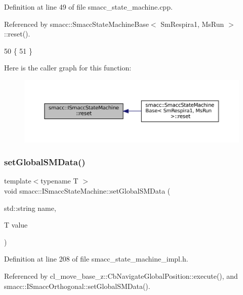 Definition at line 49 of file smacc\+\_\+state\+\_\+machine.\+cpp.



Referenced by smacc\+::\+Smacc\+State\+Machine\+Base$<$ Sm\+Respira1, Ms\+Run $>$\+::reset().


\begin{DoxyCode}
50 \{
51 \}
\end{DoxyCode}
Here is the caller graph for this function\+:
\nopagebreak
\begin{figure}[H]
\begin{center}
\leavevmode
\includegraphics[width=350pt]{classsmacc_1_1ISmaccStateMachine_a9e4b4fe4dda962642397993235c6eea0_icgraph}
\end{center}
\end{figure}
\mbox{\label{classsmacc_1_1ISmaccStateMachine_a8588f9e580fbb95b53e2bd2ca3ff1f98}} 
\subsubsection{\texorpdfstring{set\+Global\+S\+M\+Data()}{setGlobalSMData()}}
{\footnotesize\ttfamily template$<$typename T $>$ \\
void smacc\+::\+I\+Smacc\+State\+Machine\+::set\+Global\+S\+M\+Data (\begin{DoxyParamCaption}\item[{std\+::string}]{name,  }\item[{T}]{value }\end{DoxyParamCaption})}



Definition at line 208 of file smacc\+\_\+state\+\_\+machine\+\_\+impl.\+h.



Referenced by cl\+\_\+move\+\_\+base\+\_\+z\+::\+Cb\+Navigate\+Global\+Position\+::execute(), and smacc\+::\+I\+Smacc\+Orthogonal\+::set\+Global\+S\+M\+Data().


